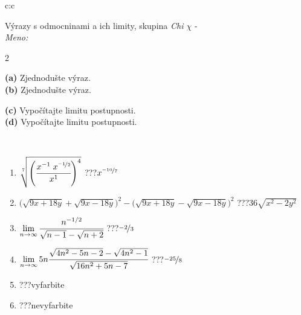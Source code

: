 \documentclass[10pt]{report}
\begin{document}
\begin{tabular}{c:c}
\begin{minipage}[c][104.5mm][t]{0.5\linewidth}
\begin{center}
\vspace{7mm}
{\huge {\Large Výrazy s odmocninami a ich limity}, skupina \textit{Chi $\chi$} -}\\[5mm]
\textit{Meno:}\phantom{xxxxxxxxxxxxxxxxxxxxxxxxxxxxxxxxxxxxxxxxxxxxxxxxxxxxxxxxxxxxxxxxx}\\[5mm]
\begin{minipage}{0.95\linewidth}
\begin{center}
{\small \begin{multicols}{2} \raggedright
\phantom{xxxxxxxxx}\textbf{(a)} Zjednodušte výraz. \\[1mm]
\phantom{xxxxxxxxx}\textbf{(b)} Zjednodušte výraz. \par \columnbreak
\textbf{(c)} Vypočítajte limitu postupnosti. \\[1mm]
\textbf{(d)} Vypočítajte limitu postupnosti.
\end{multicols}
}
\end{center}
\end{minipage}
\\[4mm]
\begin{minipage}{0.79\linewidth}
\begin{center}
\begin{varwidth}{\linewidth}
\begin{enumerate}
\small
\item $\sqrt[7]{\left(\cfrac{x^{-1}\;x^{\nicefrac{-1}{2}}}{x^{1}}\right)^{4}}$\quad \dotfill\; ???\;\dotfill \quad $x^{\nicefrac{-10}{7}}$
\item {\footnotesize{\scriptsize$\big(\sqrt{9x+18y}+\sqrt{9x-18y}\big)^2-\big(\sqrt{9x+18y}-\sqrt{9x-18y}\big)^2$}\quad \dotfill\; ???\;\dotfill \quad $36\sqrt{x^2-2y^2}$}
\item $\lim\limits_{n\to\infty}\cfrac{n^{-1/2}}{\sqrt{n-1}-\sqrt{n+2}}$\quad \dotfill\; ???\;\dotfill \quad $\nicefrac{-2}{3}$
\item $\lim\limits_{n\to\infty}5n\cfrac{\sqrt{4n^2-5n-2}-\sqrt{4n^2-1}}{\sqrt{16n^2+5n-7}}$\quad \dotfill\; ???\;\dotfill \quad $\nicefrac{-25}{8}$
\item \quad \dotfill\; ???\;\dotfill \quad vyfarbite
\item \quad \dotfill\; ???\;\dotfill \quad nevyfarbite
\end{enumerate}
\end{varwidth}

\end{center}
\end{minipage}
\end{center}
\end{minipage}
\end{tabular}
\end{document}
